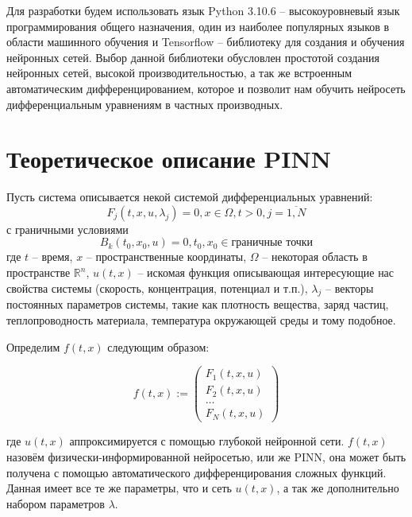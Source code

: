 \documentclass[a4paper,14pt]{extarticle} %
\begin{document}
Для разработки будем использовать язык Python 3.10.6 -- высокоуровневый язык программирования общего назначения, один из наиболее популярных языков в области машинного обучения и Tensorflow -- библиотеку для создания и обучения нейронных сетей. Выбор данной библиотеки обусловлен простотой создания нейронных сетей, высокой производительностью, а так же встроенным автоматическим дифференцированием, которое и позволит нам обучить нейросеть дифференциальным уравнениям в частных производных.

\newpage
\section{Теоретическое описание PINN}

Пусть система описывается некой системой дифференциальных уравнений:
\begin{equation}\label{eq:1syst}
    F_j(t, x, u, \lambda_j) = 0, x\in\Omega, t > 0, j=\overline{1,N}
\end{equation}
с граничными условиями
\begin{equation}
    B_k(t_0,x_0, u) = 0, t_0, x_0 \in \text{граничные точки}
\end{equation}
где $t$ -- время, $x$ -- пространственные координаты, $\Omega$ -- некоторая область в пространстве $\mathbb{R}^n$,  $u(t,x)$ -- искомая функция описывающая интересующие нас свойства системы (скорость, концентрация, потенциал и т.п.), $\lambda_j$ -- векторы постоянных параметров системы, такие как плотность вещества, заряд частиц, теплопроводность материала, температура окружающей среды и тому подобное.

Определим $f(t,x)$ следующим образом:

\begin{equation}
    f(t,x):=\begin{pmatrix}
        F_1(t,x,u) \\
        F_2(t,x,u) \\
        \dots      \\
        F_N(t,x,u)
    \end{pmatrix}
\end{equation}

где $u(t,x)$ аппроксимируется с помощью глубокой нейронной сети. $f(t,x)$ назовём физически-информированной нейросетью, или же PINN, она может быть получена с помощью автоматического дифференцирования сложных функций. Данная имеет все те же параметры, что и сеть $u(t,x)$, а так же дополнительно набором параметров $\lambda$.
\end{document}
